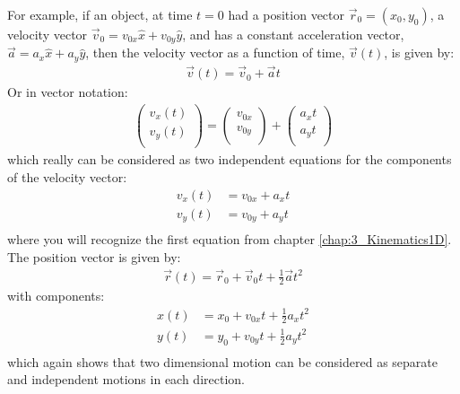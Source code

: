 For example, if an object, at time $t=0$ had a position vector $\vec r_0=(x_0,y_0)$, a velocity vector $\vec v_0=v_{0x}\hat x + v_{0y}\hat y$, and has a constant acceleration vector, $\vec a = a_x\hat x+a_y\hat y$, then the velocity vector as a function of time, $\vec v(t)$, is given by:
\begin{align*}
\vec v(t) = \vec v_0 + \vec a t
\end{align*}
Or in vector notation:
\begin{align*}
\begin{pmatrix}
           v_x(t) \\
           v_y(t) \\
         \end{pmatrix} = \begin{pmatrix}
           v_{0x} \\
           v_{0y} \\
         \end{pmatrix} + \begin{pmatrix}
           a_xt \\
           a_yt \\
         \end{pmatrix}
\end{align*}
which really can be considered as two independent equations for the components of the velocity vector:
\begin{align*}
v_x(t)&=v_{0x}+a_xt \\
v_y(t)&=v_{0y}+a_yt \\
\end{align*}
where you will recognize the first equation from chapter \ref{chap:3_Kinematics1D}. The position vector is given by:
\begin{align*}
\vec r(t) = \vec r_0 + \vec v_0 t + \frac{1}{2} \vec at^2
\end{align*}
with components:
\begin{align*}
x(t) &= x_0+v_{0x}t+\frac{1}{2}a_xt^2\\
y(t) &= y_0+v_{0y}t+\frac{1}{2}a_yt^2\\
\end{align*}
which again shows that two dimensional motion can be considered as separate and independent motions in each direction.

